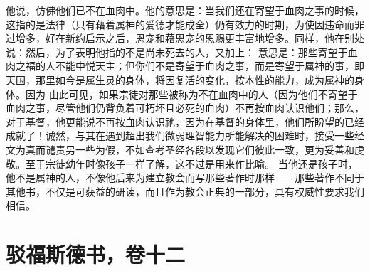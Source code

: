 他说，仿佛他们已不在血肉中。他的意思是：当我们还在寄望于血肉之事的时候，这指的是法律（只有藉着属神的爱德才能成全）仍有效力的时期，为使因违命而罪过增多，好在新约启示之后，恩宠和藉恩宠的恩赐更丰富地增多。同样，他在别处说：然后，为了表明他指的不是尚未死去的人，又加上：  意思是：那些寄望于血肉之福的人不能中悦天主；但你们不是寄望于血肉之事，而是寄望于属神的事，即天国，那里如今是属生灵的身体，将因复活的变化，按本性的能力，成为属神的身体。因为  由此可见，如果宗徒对那些被称为不在血肉中的人（因为他们不寄望于血肉之事，尽管他们仍背负着可朽坏且必死的血肉）不再按血肉认识他们；那么，对于基督，他更能说不再按血肉认识祂，因为在基督的身体里，他们所盼望的已经成就了！诚然，与其在遇到超出我们微弱理智能力所能解决的困难时，接受一些经文为真而谴责另一些为假，不如查考圣经各段以发现它们彼此一致，更为妥善和虔敬。至于宗徒幼年时像孩子一样了解，这不过是用来作比喻。 当他还是孩子时，他不是属神的人，不像他后来为建立教会而写那些著作时那样——那些著作不同于其他书，不仅是可获益的研读，而且作为教会正典的一部分，具有权威性要求我们相信。\par



\section{驳福斯德书，卷十二}

\par

